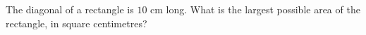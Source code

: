 The diagonal of a rectangle is $10$ cm long. What is the largest possible area of the rectangle, in square centimetres?
